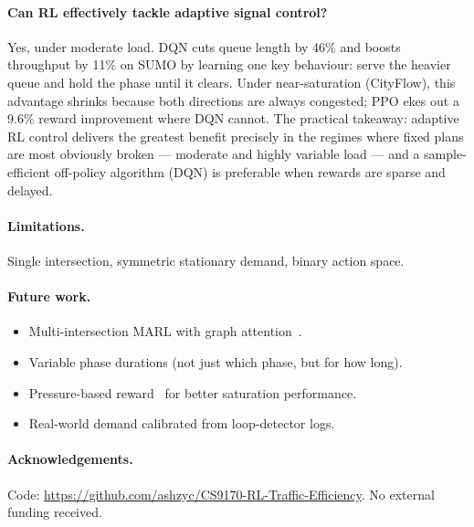 \documentclass[10pt]{article}
\begin{document}
\paragraph{Can RL effectively tackle adaptive signal control?}
Yes, under moderate load.  DQN cuts queue length by 46\% and boosts throughput
by 11\% on SUMO by learning one key behaviour: serve the heavier queue and
hold the phase until it clears.  Under near-saturation (CityFlow), this
advantage shrinks because both directions are always congested; PPO ekes out a
9.6\% reward improvement where DQN cannot.  The practical takeaway: adaptive RL
control delivers the greatest benefit precisely in the regimes where fixed plans
are most obviously broken — moderate and highly variable load — and a
sample-efficient off-policy algorithm (DQN) is preferable when rewards are
sparse and delayed.

\paragraph{Limitations.}
Single intersection, symmetric stationary demand, binary action space.

\paragraph{Future work.}
\begin{itemize}
  \item Multi-intersection MARL with graph attention~\citep{wei2019colight}.
  \item Variable phase durations (not just which phase, but for how long).
  \item Pressure-based reward~\citep{wei2019presslight} for better saturation performance.
  \item Real-world demand calibrated from loop-detector logs.
\end{itemize}

\paragraph{Acknowledgements.}
Code: \url{https://github.com/ashzyc/CS9170-RL-Traffic-Efficiency}.
No external funding received.



\end{document}
